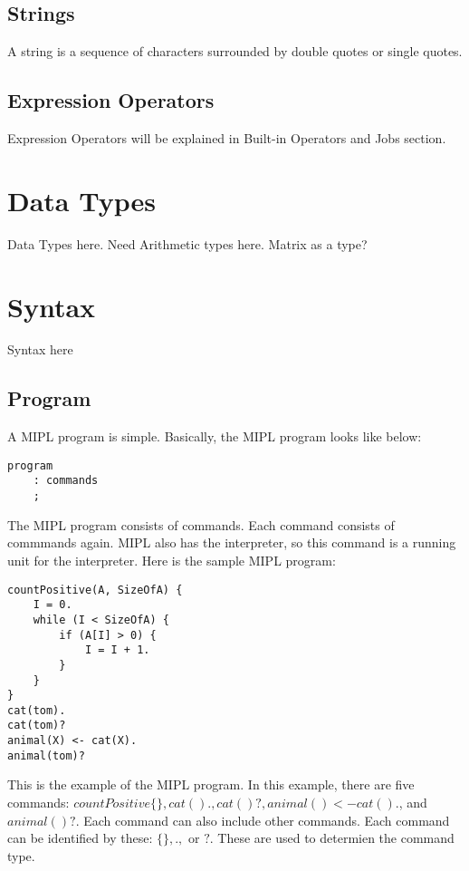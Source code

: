 \documentclass[prodmode,acmtecs]{acmsmall}
\begin{document}
\subsection{Strings}

A string is a sequence of characters surrounded by double quotes or single
quotes.

\subsection{Expression Operators}
Expression Operators will be explained in Built-in Operators and Jobs section.

\section{Data Types}

Data Types here. Need Arithmetic types here. Matrix as a type?

\section{Syntax}

Syntax here

\subsection{Program}

A MIPL program is simple. Basically, the MIPL program looks like below:

\begin{lstlisting}
program
	: commands
	;
\end{lstlisting}

The MIPL program consists of commands. Each command consists of commmands again.
 MIPL also has the interpreter, so this command is a running unit for the interpreter.
 Here is the sample MIPL program:

\begin{lstlisting}
countPositive(A, SizeOfA) {
    I = 0.
    while (I < SizeOfA) {
        if (A[I] > 0) {
            I = I + 1.
        }
    }
}
cat(tom).
cat(tom)?
animal(X) <- cat(X).
animal(tom)?
\end{lstlisting}

This is the example of the MIPL program. In this example, there are five commands:
 $countPositive\{\}, cat()., cat()?, animal() <- cat().$, and $animal()?$. Each
 command can also include other commands. Each command can be identified by these:
 $\{\}, .,$ or $?$. These are used to determien the command type.\\
\end{document}
